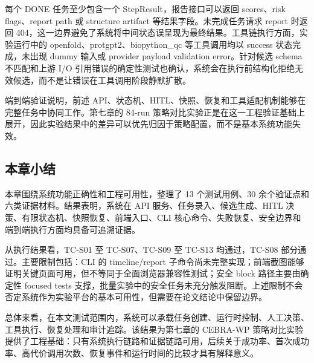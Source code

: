 每个 DONE 任务至少包含一个 StepResult，报告接口可以返回 scores、risk
flags、report path 或 structure artifact 等结果字段。未完成任务请求
report 时返回
404，这一边界避免了系统将中间状态误呈现为最终结果。工具链执行方面，实验运行中的
openfold、protgpt2、biopython\_qc 等工具调用均以 success
状态完成，未出现 dummy 输入或 provider payload validation
error。针对候选 schema 不匹配和上游 I/O
引用错误的确定性测试也确认，系统会在执行前结构化拒绝无效候选，而不是让错误在工具调用阶段静默扩散。

端到端验证说明，前述
API、状态机、HITL、快照、恢复和工具适配机制能够在完整任务中协同工作。第七章的
84-run
策略对比实验正是在这一工程验证基础上展开，因此实验结果中的差异可以优先归因于策略配置，而不是基本系统功能失效。

\subsection{本章小结}\label{testing-validation-summary}

本章围绕系统功能正确性和工程可用性，整理了 13 个测试用例、30
余个验证点和六类证据材料。结果表明，系统在 API
服务、任务录入、候选生成、HITL 决策、有限状态机、快照恢复、前端入口、CLI
核心命令、失败恢复、安全边界和端到端执行方面均具备可追溯证据。

从执行结果看，TC-S01 至 TC-S07、TC-S09 至 TC-S13 均通过，TC-S08
部分通过。主要限制包括：CLI 的 timeline/report
子命令尚未完整实现；前端截图能够证明关键页面可用，但不等同于全面浏览器兼容性测试；安全
block 路径主要由确定性 focused tests
支撑，批量实验中的安全任务未充分触发阻断。上述限制不会否定系统作为实验平台的基本可用性，但需要在论文结论中保留边界。

总体来看，在本文测试范围内，系统可以承载任务创建、运行时控制、人工决策、工具执行、恢复处理和审计追踪。该结果为第七章的
CEBRA-WP
策略对比实验提供了工程基础：只有系统执行链路和证据链路可用，后续关于成功率、首次成功率、高代价调用次数、恢复事件和运行时间的比较才具有解释意义。
